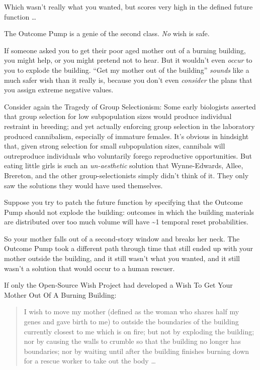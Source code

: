 {
 Which wasn't really what you wanted, but scores
very high in the defined future function \ldots}

{
 The Outcome Pump is a genie of the second class. \textit{No} wish
is safe.}

{
 If someone asked you to get their poor aged mother out of a
burning building, you might help, or you might pretend not to hear. But
it wouldn't even \textit{occur} to you to explode the
building. ``Get my mother out of the
building'' \textit{sounds} like a much safer wish
than it really is, because you don't even
\textit{consider} the plans that you assign extreme negative values.}

{
 Consider again the Tragedy of Group Selectionism: Some early
biologists asserted that group selection for low subpopulation sizes
would produce individual restraint in breeding; and yet actually
enforcing group selection in the laboratory produced cannibalism,
especially of immature females. It's obvious in
hindsight that, given strong selection for small subpopulation sizes,
cannibals will outreproduce individuals who voluntarily forego
reproductive opportunities. But eating little girls is such an
\textit{un-aesthetic} solution that Wynne-Edwards, Allee, Brereton, and
the other group-selectionists simply didn't think of
it. They only saw the solutions they would have used themselves.}

{
 Suppose you try to patch the future function by specifying that
the Outcome Pump should not explode the building: outcomes in which the
building materials are distributed over too much volume will have \~{}1
temporal reset probabilities.}

{
 So your mother falls out of a second-story window and breaks her
neck. The Outcome Pump took a different path through time that still
ended up with your mother outside the building, and it still
wasn't what you wanted, and it still
wasn't a solution that would occur to a human rescuer.}

{
 If only the Open-Source Wish Project had developed a Wish To Get
Your Mother Out Of A Burning Building:}

\begin{quote}
{
 I wish to move my mother (defined as the woman who shares half my
genes and gave birth to me) to outside the boundaries of the building
currently closest to me which is on fire; but not by exploding the
building; nor by causing the walls to crumble so that the building no
longer has boundaries; nor by waiting until after the building finishes
burning down for a rescue worker to take out the body \ldots}
\end{quote}

